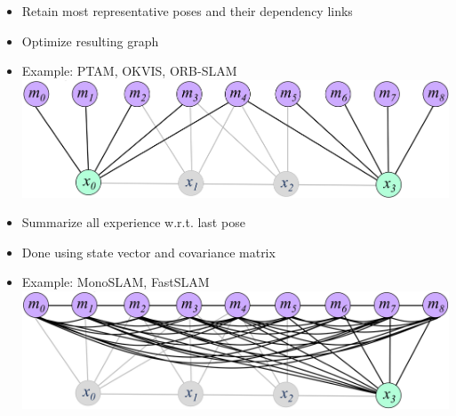 \begin{itemize}
\begin{itemize}
                \begin{itemize}
                    \item Retain most representative poses and their dependency links
                    \item Optimize resulting graph
                    \item Example: PTAM, OKVIS, ORB-SLAM
                    \\ \includegraphics[width=\linewidth]{./Figures/05_SLAM_KeyFrames.png}
                \end{itemize}
                \begin{itemize}
                    \item Summarize all experience w.r.t. last pose
                    \item Done using state vector and covariance matrix
                    \item Example: MonoSLAM, FastSLAM
                    \\ \includegraphics[width=\linewidth]{./Figures/05_SLAM_Filtering.png}
                \end{itemize}
        \end{itemize}
\end{itemize}

